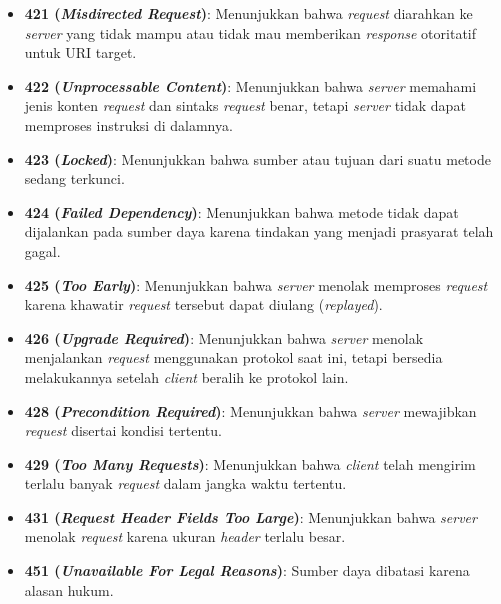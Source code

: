 \begin{itemize}
    \item \textbf{421 (\textit{Misdirected Request})}: Menunjukkan bahwa \textit{request} diarahkan ke \textit{server} yang tidak mampu atau tidak mau memberikan \textit{response} otoritatif untuk URI target.
  
    \item \textbf{422 (\textit{Unprocessable Content})}: Menunjukkan bahwa \textit{server} memahami jenis konten \textit{request} dan sintaks \textit{request} benar, tetapi \textit{server} tidak dapat memproses instruksi di dalamnya.
  
    \item \textbf{423 (\textit{Locked})}: Menunjukkan bahwa sumber atau tujuan dari suatu metode sedang terkunci.~\cite{RFC4918}
  
    \item \textbf{424 (\textit{Failed Dependency})}: Menunjukkan bahwa metode tidak dapat dijalankan pada sumber daya karena tindakan yang menjadi prasyarat telah gagal.~\cite{RFC4918}
  
    \item \textbf{425 (\textit{Too Early})}: Menunjukkan bahwa \textit{server} menolak memproses \textit{request} karena khawatir \textit{request} tersebut dapat diulang (\textit{replayed}).~\cite{RFC8470}
  
    \item \textbf{426 (\textit{Upgrade Required})}: Menunjukkan bahwa \textit{server} menolak menjalankan \textit{request} menggunakan protokol saat ini, tetapi bersedia melakukannya setelah \textit{client} beralih ke protokol lain.
  
    \item \textbf{428 (\textit{Precondition Required})}: Menunjukkan bahwa \textit{server} mewajibkan \textit{request} disertai kondisi tertentu.~\cite{RFC6585}
  
    \item \textbf{429 (\textit{Too Many Requests})}: Menunjukkan bahwa \textit{client} telah mengirim terlalu banyak \textit{request} dalam jangka waktu tertentu.~\cite{RFC6585}
  
    \item \textbf{431 (\textit{Request Header Fields Too Large})}: Menunjukkan bahwa \textit{server} menolak \textit{request} karena ukuran \textit{header} terlalu besar.~\cite{RFC6585}
  
    \item \textbf{451 (\textit{Unavailable For Legal Reasons})}: Sumber daya dibatasi karena alasan hukum.~\cite{RFC7725}
  
\end{itemize}

